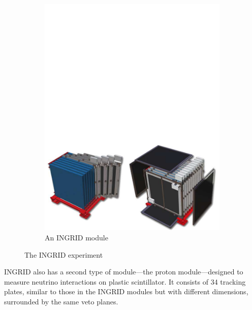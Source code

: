 \begin{figure}[h]
\begin{subfigure}[t]{0.47\textwidth}
		\includegraphics[width=\textwidth, trim={0mm 0mm 0mm 50mm}, clip,page=1]{figures/det_chap/ingrid/ingrid_module}
		\caption{An INGRID module}
	\end{subfigure}
	\caption{The INGRID experiment}
	\label{fig:ingrid_det}
\end{figure}
INGRID also has a second type of module---the proton module---designed to measure neutrino interactions on plastic scintillator. It consists of 34 tracking plates, similar to those in the INGRID modules but with different dimensions, surrounded by the same veto planes\cite{t2k_ingrid_proton}.

